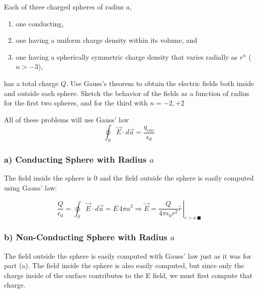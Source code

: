 \begin{question}

  Each of three charged spheres of radius $a$,

  \begin{enumerate}[label=\alph*]

  \item one conducting,

  \item one having a uniform charge density within its volume, and

  \item one having a spherically symmetric charge density that varies
    radially as $r^n$ ($n > -3$),

  \end{enumerate}
  has a total charge $Q$. Use Gauss's theorem to obtain the electric
  fields both inside and outside each sphere. Sketch the behavior of
  the fields as a function of radius for the first two spheres, and
  for the third with $n = -2, +2$

\end{question}

All of these problems will use Gauss' law
\begin{equation}
  \oint_S \vec{E} \cdot d\vec{a} = \frac{q_{enc}}{\epsilon_0}
\end{equation}


\subsubsection*{a) Conducting Sphere with Radius $a$}

The field inside the sphere is 0 and the field outside the sphere is
easily computed using Gauss' law:

\begin{equation}
  \frac{Q}{\epsilon_0}
  = \oint_S \vec{E} \cdot d\vec{a}
  = E \,4 \pi a^2
  \Rightarrow \vec{E} = \left. \frac{Q}{4 \pi \epsilon_0 r^2} \hat{r}\, \right|_{r>a\ \blacksquare}
\end{equation}



\subsubsection*{b) Non-Conducting Sphere with Radius $a$}

The field outside the sphere is easily computed with Gauss' law just
as it was for part (a).  The field inside the sphere is also easily
computed, but since only the charge inside of the surface contributes
to the E field, we must first compute that charge.


